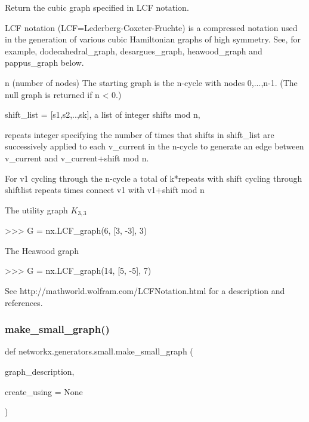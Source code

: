 \begin{DoxyVerb}Return the cubic graph specified in LCF notation.

LCF notation (LCF=Lederberg-Coxeter-Fruchte) is a compressed
notation used in the generation of various cubic Hamiltonian
graphs of high symmetry. See, for example, dodecahedral_graph,
desargues_graph, heawood_graph and pappus_graph below.

n (number of nodes)
  The starting graph is the n-cycle with nodes 0,...,n-1.
  (The null graph is returned if n < 0.)

shift_list = [s1,s2,..,sk], a list of integer shifts mod n,

repeats
  integer specifying the number of times that shifts in shift_list
  are successively applied to each v_current in the n-cycle
  to generate an edge between v_current and v_current+shift mod n.

For v1 cycling through the n-cycle a total of k*repeats
with shift cycling through shiftlist repeats times connect
v1 with v1+shift mod n

The utility graph $K_{3,3}$

>>> G = nx.LCF_graph(6, [3, -3], 3)

The Heawood graph

>>> G = nx.LCF_graph(14, [5, -5], 7)

See http://mathworld.wolfram.com/LCFNotation.html for a description
and references.\end{DoxyVerb}
 \mbox{\label{namespacenetworkx_1_1generators_1_1small_a82aa279e09ad98f0e256fe604d609ee7}} 
\subsubsection{\texorpdfstring{make\+\_\+small\+\_\+graph()}{make\_small\_graph()}}
{\footnotesize\ttfamily def networkx.\+generators.\+small.\+make\+\_\+small\+\_\+graph (\begin{DoxyParamCaption}\item[{}]{graph\+\_\+description,  }\item[{}]{create\+\_\+using = {\ttfamily None} }\end{DoxyParamCaption})}

